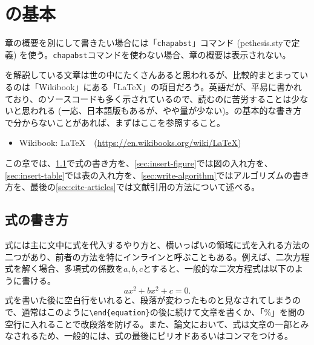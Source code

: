 \chapter{\latex の基本}
\label{chap:latex-basic}

\begin{chapabst}
  章の概要を別にして書きたい場合には「\texttt{chapabst}」コマンド (pethesis.styで定義) を使う。\texttt{chapabst}コマンドを使わない場合、章の概要は表示されない。
\end{chapabst}

\latex を解説している文章は世の中にたくさんあると思われるが、比較的まとまっているのは「Wikibook」にある「LaTeX」の項目だろう。英語だが、平易に書かれており、\latex のソースコードも多く示されているので、読むのに苦労することは少ないと思われる (一応、日本語版もあるが、やや量が少ない)。\latex の基本的な書き方で分からないことがあれば、まずはここを参照すること。
\begin{itemize}
  \item \textsf{Wikibook: LaTeX}~~(\url{https://en.wikibooks.org/wiki/LaTeX})
\end{itemize}

この章では、\cref{sec:write-equation}で式の書き方を、\cref{sec:insert-figure}では図の入れ方を、\cref{sec:insert-table}では表の入れ方を、\cref{sec:write-algorithm}ではアルゴリズムの書き方を、最後の\cref{sec:cite-articles}では文献引用の方法について述べる。

\section{式の書き方}
\label{sec:write-equation}

式には主に文中に式を代入するやり方と、横いっぱいの領域に式を入れる方法の二つがあり、前者の方法を特にインラインと呼ぶこともある。例えば、二次方程式を解く場合、多項式の係数を$a, b, c$とすると、一般的な二次方程式は以下のように書ける。
%
\begin{equation}
  a x^2 + b x^2 + c = 0.
  \label{eq:quadratic-equation}
\end{equation}
%
式を書いた後に空白行をいれると、段落が変わったものと見なされてしまうので、通常はこのように\texttt{\textbackslash end\{equation\}}の後に続けて文章を書くか、「\%」を間の空行に入れることで改段落を防げる。また、論文において、式は文章の一部とみなされるため、一般的には、式の最後にピリオドあるいはコンマをつける。

